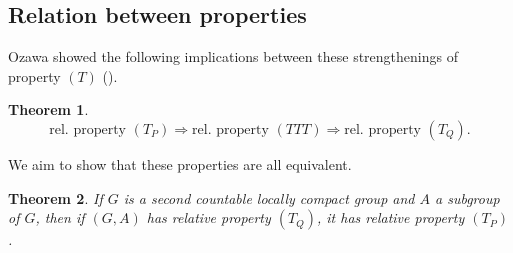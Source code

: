 \documentclass{article}
\newtheorem{theorem}{Theorem}[section]
\theoremstyle{definition}
\theoremstyle{remark}
\numberwithin{equation}{section}
\begin{document}
\subsection{Relation between properties}
Ozawa showed the following implications between these strengthenings of property $(T)$ (\cite[Thm. 1]{Ozawa+2011+89+104}).
\begin{theorem}\label{thm:ozawa_impl}
    $$\textrm{rel. property }(T_P) \Longrightarrow \textrm{rel. property }(TTT)\Longrightarrow \textrm{rel. property }(T_Q).  $$
\end{theorem}

We aim to show that these properties are all equivalent.

\begin{theorem}\label{thm:equiv}
    If $G$ is a second countable locally compact group and $A$ a subgroup of $G$, then if $(G,A)$ has relative property $(T_Q)$, it has relative property $(T_P)$.
\end{theorem}
\end{document}
